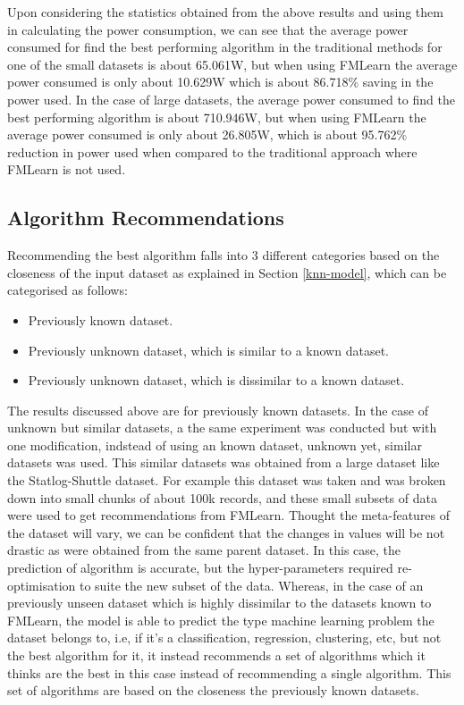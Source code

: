 Upon considering the statistics obtained from the above results and using them in calculating the power consumption, we can see that the average power consumed for find the best performing algorithm in the traditional methods for one of the small datasets is about 65.061W, but when using FMLearn the average power consumed is only about 10.629W which is about 86.718\% saving in the power used. In the case of large datasets, the average power consumed to find the best performing algorithm is about 710.946W, but when using FMLearn the average power consumed is only about 26.805W, which is about 95.762\% reduction in power used when compared to the traditional approach where FMLearn is not used.

\subsection*{Algorithm Recommendations}

Recommending the best algorithm falls into 3 different categories based on the closeness of the input dataset as explained in Section \ref{knn-model}, which can be categorised as follows:
\begin{itemize}
    \item Previously known dataset.
    \item Previously unknown dataset, which is similar to a known dataset.
    \item Previously unknown dataset, which is dissimilar to a known dataset.
\end{itemize}

The results discussed above are for previously known datasets. In the case of unknown but similar datasets, a the same experiment was conducted but with one modification, indstead of using an known dataset, unknown yet, similar datasets was used. This similar datasets was obtained from a large dataset like the Statlog-Shuttle dataset. For example this dataset was taken and was broken down into small chunks of about 100k records, and these small subsets of data were used to get recommendations from FMLearn. Thought the meta-features of the dataset will vary, we can be confident that the changes in values will be not drastic as were obtained from the same parent dataset. In this case, the prediction of algorithm is accurate, but the hyper-parameters required re-optimisation to suite the new subset of the data. Whereas, in the case of an previously unseen dataset which is highly dissimilar to the datasets known to FMLearn, the model is able to predict the type machine learning problem the dataset belongs to, i.e, if it's a classification, regression, clustering, etc, but not the best algorithm for it, it instead recommends a set of algorithms which it thinks are the best in this case instead of recommending a single algorithm. This set of algorithms are based on the closeness the previously known datasets.